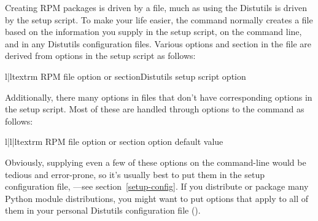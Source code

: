 \documentclass{howto}
\begin{document}
Creating RPM packages is driven by a  file, much as using
the Distutils is driven by the setup script.  To make your life easier,
the  command normally creates a  file
based on the information you supply in the setup script, on the command
line, and in any Distutils configuration files.  Various options and
section in the  file are derived from options in the setup
script as follows:
\begin{tableii}{l|l}{textrm}%
  {RPM  file option or section}{Distutils setup script option}
\end{tableii}

Additionally, there many options in  files that don't have
corresponding options in the setup script.  Most of these are handled
through options to the  command as follows:
\begin{tableiii}{l|l|l}{textrm}%
  {RPM  file option or section}%
  { option}%
  {default value}
\end{tableiii}
Obviously, supplying even a few of these options on the command-line
would be tedious and error-prone, so it's usually best to put them in
the setup configuration file, ---see
section~\ref{setup-config}.  If you distribute or package many Python
module distributions, you might want to put options that apply to all of
them in your personal Distutils configuration file
().
\end{document}
